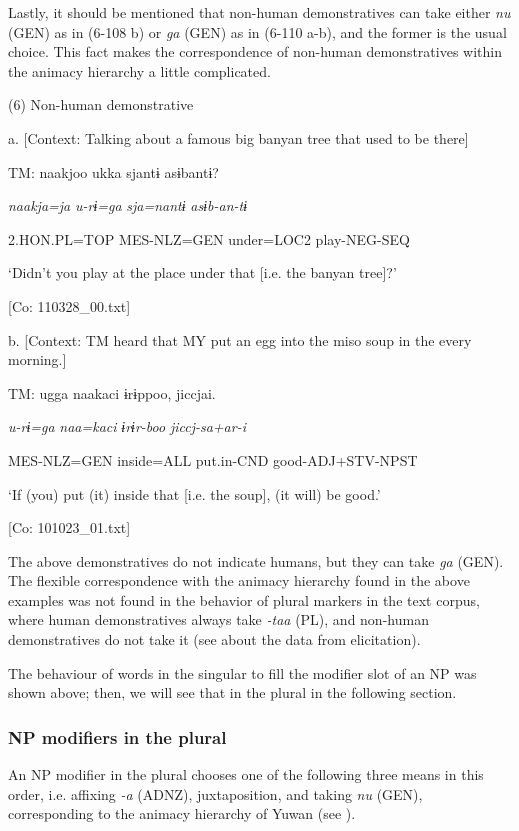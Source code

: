   Lastly, it should be mentioned that non-human demonstratives can take either \textit{nu} (GEN) as in (6-108 b) or \textit{ga} (GEN) as in (6-110 a-b), and the former is the usual choice. This fact makes the correspondence of non-human demonstratives within the animacy hierarchy a little complicated.

(6)  Non-human demonstrative

  a.  [Context: Talking about a famous big banyan tree that used to be there]

    TM:  naakjoo  ukka  sjantɨ  asɨbantɨ?

      \textit{naakja=ja}  \textit{u-rɨ=ga}  \textit{sja=nantɨ}  \textit{asɨb-an-tɨ}

      2.HON.PL=TOP  MES-NLZ=GEN  under=LOC2  play-NEG-SEQ

      ‘Didn’t you play at the place under that [i.e. the banyan tree]?’

      [Co: 110328\_00.txt]

  b.  [Context: TM heard that MY put an egg into the miso soup in the every morning.]

    TM:  ugga  naakaci  ɨrɨppoo,  jiccjai.

      \textit{u-rɨ=ga}  \textit{naa=kaci}  \textit{ɨrɨr-boo}  \textit{jiccj-sa+ar-i}

      MES-NLZ=GEN  inside=ALL  put.in-CND  good-ADJ+STV-NPST

      ‘If (you) put (it) inside that [i.e. the soup], (it will) be good.’

      [Co: 101023\_01.txt]

The above demonstratives do not indicate humans, but they can take \textit{ga} (GEN). The flexible correspondence with the animacy hierarchy found in the above examples was not found in the behavior of plural markers in the text corpus, where human demonstratives always take \textit{{}-taa} (PL), and non-human demonstratives do not take it (see  about the data from elicitation).

  The behaviour of words in the singular to fill the modifier slot of an NP was shown above; then, we will see that in the plural in the following section.

\subsubsection{NP modifiers in the plural}

An NP modifier in the plural chooses one of the following three means in this order, i.e. affixing \textit{{}-a} (ADNZ), juxtaposition, and taking \textit{nu} (GEN), corresponding to the animacy hierarchy of Yuwan (see ).


